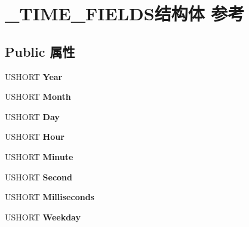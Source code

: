 \hypertarget{struct___t_i_m_e___f_i_e_l_d_s}{}\section{\+\_\+\+T\+I\+M\+E\+\_\+\+F\+I\+E\+L\+D\+S结构体 参考}
\label{struct___t_i_m_e___f_i_e_l_d_s}
\subsection*{Public 属性}
\begin{DoxyCompactItemize}
\item 
\mbox{\label{struct___t_i_m_e___f_i_e_l_d_s_a45f1757e58fb3f019a8ecddf22308880}} 
U\+S\+H\+O\+RT {\bfseries Year}
\item 
\mbox{\label{struct___t_i_m_e___f_i_e_l_d_s_a179c70239b838307d2d3c652c106e402}} 
U\+S\+H\+O\+RT {\bfseries Month}
\item 
\mbox{\label{struct___t_i_m_e___f_i_e_l_d_s_a44a93ddb340afe00b92bf5a56f6ad6e8}} 
U\+S\+H\+O\+RT {\bfseries Day}
\item 
\mbox{\label{struct___t_i_m_e___f_i_e_l_d_s_ab0a40579f998b71d04c84c240c8bb58d}} 
U\+S\+H\+O\+RT {\bfseries Hour}
\item 
\mbox{\label{struct___t_i_m_e___f_i_e_l_d_s_a417cc542cb101d9ab563364d25e10653}} 
U\+S\+H\+O\+RT {\bfseries Minute}
\item 
\mbox{\label{struct___t_i_m_e___f_i_e_l_d_s_adf9dca0d7f296f1bc44b928aa69b5550}} 
U\+S\+H\+O\+RT {\bfseries Second}
\item 
\mbox{\label{struct___t_i_m_e___f_i_e_l_d_s_a2ec268394c8f014a80f1d3282f486f1c}} 
U\+S\+H\+O\+RT {\bfseries Milliseconds}
\item 
\mbox{\label{struct___t_i_m_e___f_i_e_l_d_s_aa2c91b315f827948f096dd8e6d37ee50}} 
U\+S\+H\+O\+RT {\bfseries Weekday}
\item 

\end{DoxyCompactItemize}
